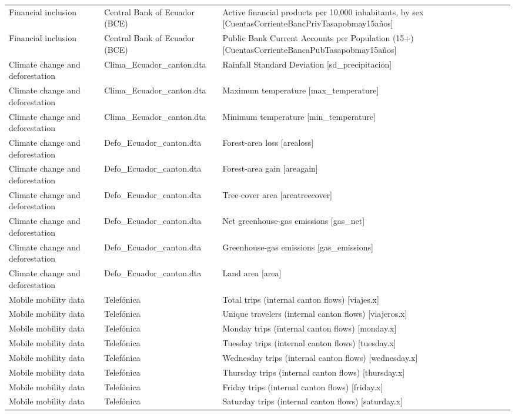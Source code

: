 \documentclass[10pt,a4paper]{article}
\begin{document}
\begin{longtable}{@{}>{\raggedright\arraybackslash}p{3.5cm}>{\raggedright\arraybackslash}p{5.6cm}>{\raggedright\arraybackslash}p{\dimexpr\textwidth-9.1cm-4\tabcolsep\relax}@{}}
Financial inclusion & Central Bank of Ecuador (BCE) & Active financial products per 10,000 inhabitants, by sex [CuentasCorrienteBancPrivTasapobmay15a\~{n}os]\\
Financial inclusion & Central Bank of Ecuador (BCE) & Public Bank Current Accounts per Population (15+) [CuentasCorrienteBancaPubTasapobmay15a\~{n}os]\\
Climate change and deforestation & Clima\_Ecuador\_canton.dta & Rainfall Standard Deviation [sd\_precipitacion]\\
Climate change and deforestation & Clima\_Ecuador\_canton.dta & Maximum temperature [max\_temperature]\\
Climate change and deforestation & Clima\_Ecuador\_canton.dta & Minimum temperature [min\_temperature]\\
Climate change and deforestation & Defo\_Ecuador\_canton.dta & Forest-area loss [arealoss]\\
Climate change and deforestation & Defo\_Ecuador\_canton.dta & Forest-area gain [areagain]\\
Climate change and deforestation & Defo\_Ecuador\_canton.dta & Tree-cover area [areatreecover]\\
Climate change and deforestation & Defo\_Ecuador\_canton.dta & Net greenhouse-gas emissions [gas\_net]\\
Climate change and deforestation & Defo\_Ecuador\_canton.dta & Greenhouse-gas emissions [gas\_emissions]\\
Climate change and deforestation & Defo\_Ecuador\_canton.dta & Land area [area]\\
Mobile mobility data & Telef\'{o}nica & Total trips (internal canton flows) [viajes.x]\\
Mobile mobility data & Telef\'{o}nica & Unique travelers (internal canton flows) [viajeros.x]\\
Mobile mobility data & Telef\'{o}nica & Monday trips (internal canton flows) [monday.x]\\
Mobile mobility data & Telef\'{o}nica & Tuesday trips (internal canton flows) [tuesday.x]\\
Mobile mobility data & Telef\'{o}nica & Wednesday trips (internal canton flows) [wednesday.x]\\
Mobile mobility data & Telef\'{o}nica & Thursday trips (internal canton flows) [thursday.x]\\
Mobile mobility data & Telef\'{o}nica & Friday trips (internal canton flows) [friday.x]\\
Mobile mobility data & Telef\'{o}nica & Saturday trips (internal canton flows) [saturday.x]\\

\end{longtable}
\end{document}
